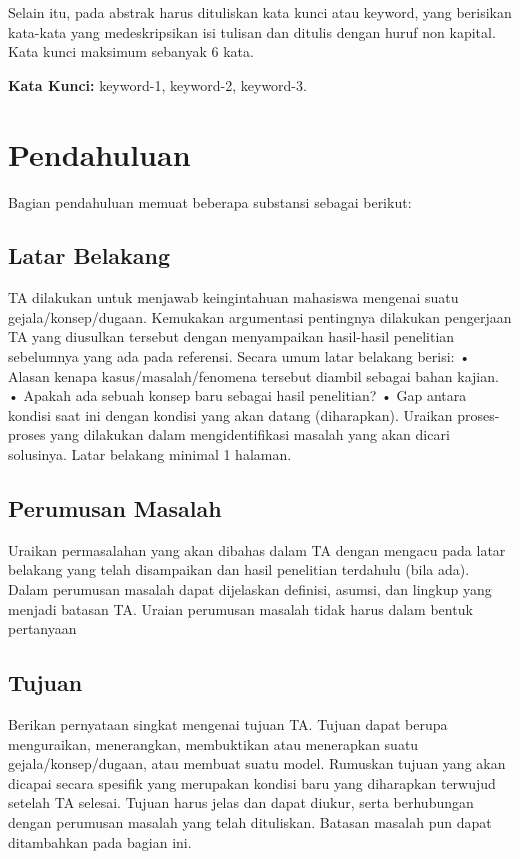 \documentclass[a4paper,12pt,oneside]{book}
\begin{document}
Selain itu, pada abstrak harus dituliskan kata kunci atau keyword, yang berisikan kata-kata yang medeskripsikan isi tulisan dan ditulis dengan huruf non kapital. Kata kunci maksimum sebanyak 6 kata.
  
\vspace{0.5 cm}
\begin{flushleft}
{\textbf{Kata Kunci:} keyword-1, keyword-2, keyword-3.}
\end{flushleft}
\cleardoublepage
{}
{}
\tableofcontents

\cleardoublepage
{}
\chapter{Pendahuluan}
Bagian pendahuluan memuat beberapa substansi sebagai berikut:

\section{Latar Belakang}
TA dilakukan untuk menjawab keingintahuan mahasiswa mengenai suatu gejala/konsep/dugaan. Kemukakan argumentasi pentingnya dilakukan pengerjaan TA yang diusulkan tersebut dengan menyampaikan hasil-hasil penelitian sebelumnya yang ada pada referensi. Secara umum latar belakang berisi:
• Alasan kenapa kasus/masalah/fenomena tersebut diambil sebagai bahan kajian.
• Apakah ada sebuah konsep baru sebagai hasil penelitian?
• Gap antara kondisi saat ini dengan kondisi yang akan datang (diharapkan).
Uraikan proses-proses yang dilakukan dalam mengidentifikasi masalah yang akan dicari solusinya. Latar belakang minimal 1 halaman.

\section{Perumusan Masalah}
Uraikan permasalahan yang akan dibahas dalam TA dengan mengacu pada latar belakang yang telah disampaikan dan hasil penelitian terdahulu (bila ada). Dalam perumusan masalah dapat dijelaskan definisi, asumsi, dan lingkup yang menjadi batasan TA. Uraian perumusan masalah tidak harus dalam bentuk pertanyaan

\section{Tujuan}
Berikan pernyataan singkat mengenai tujuan TA. Tujuan dapat berupa menguraikan, menerangkan, membuktikan atau menerapkan suatu gejala/konsep/dugaan, atau membuat suatu model. Rumuskan tujuan yang akan dicapai secara spesifik yang merupakan kondisi baru yang diharapkan terwujud setelah TA selesai. Tujuan harus jelas dan dapat diukur, serta berhubungan dengan perumusan masalah yang telah dituliskan. Batasan masalah pun dapat ditambahkan pada bagian ini.
        
\end{document}
